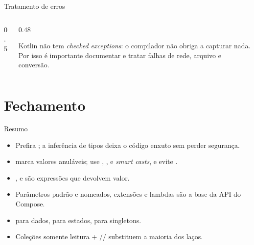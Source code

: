 \documentclass[aspectratio=169,10pt]{beamer}
\begin{document}
\begin{frame}[fragile]{Tratamento de erros}
  \begin{columns}[T]
    \begin{column}{0.5\textwidth}
    \end{column}
    \begin{column}{0.48\textwidth}
      \begin{conceito}
        Kotlin não tem \emph{checked exceptions}: o compilador não obriga a capturar nada. Por isso é importante documentar e tratar falhas de rede, arquivo e conversão.
      \end{conceito}
    \end{column}
  \end{columns}
\end{frame}

\section{Fechamento}

\begin{frame}{Resumo}
  \begin{resumo}
    \begin{itemize}
      \item Prefira ; a inferência de tipos deixa o código enxuto sem perder segurança.
      \item {} marca valores anuláveis; use , ,  e \emph{smart casts}, e evite \cod{!!}.
      \item {},  e  são expressões que devolvem valor.
      \item Parâmetros padrão e nomeados, extensões e lambdas são a base da API do Compose.
      \item {} para dados,  para estados,  para singletons.
      \item Coleções somente leitura + // substituem a maioria dos laços.
    \end{itemize}
  \end{resumo}
\end{frame}
\end{document}

